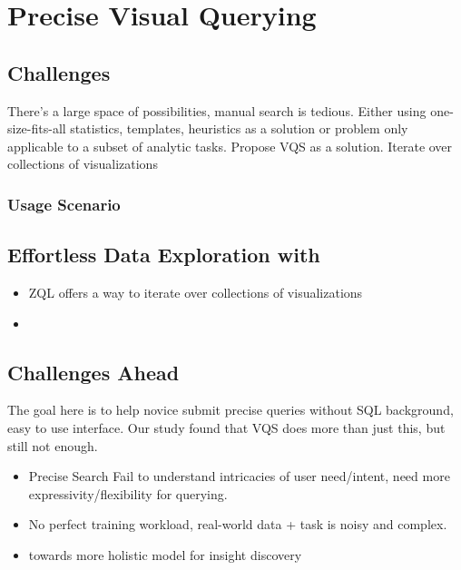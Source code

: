 \section{Precise Visual Querying\label{sec:precise}}
\subsection{Challenges}
There’s a large space of possibilities, manual search is tedious. Either using one-size-fits-all statistics, templates, heuristics as a solution or problem only applicable to a subset of analytic tasks\cite{Vartak2015,Vartak2017}. Propose VQS as a solution\cite{Lee2017}. Iterate over collections of visualizations \cite{Siddiqui}
\subsubsection{Usage Scenario}
\subsection{Effortless Data Exploration with \zv}
\begin{itemize}
	\item ZQL offers a way to iterate over collections of visualizations\cite{Wongsuphasawat2016}
	\item 
\end{itemize}

\subsection{Challenges Ahead}
The goal here is to help novice submit precise queries without SQL background, easy to use interface. Our study found that VQS does more than just this, but still not enough.
\begin{itemize}
	\item Precise Search Fail to understand intricacies of user need/intent, need more expressivity/flexibility for querying.
	\item  No perfect training workload, real-world data + task is noisy and complex. 
	\item towards more holistic model for insight discovery
\end{itemize}
